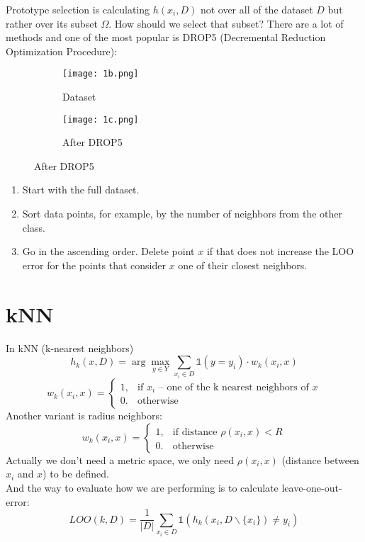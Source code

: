 Prototype selection is calculating $h(x_i, D)$ not over all of the dataset $D$ but rather over its subset $\Omega$. How should we select that subset? There are a lot of methods and one of the most popular is DROP5 (Decremental Reduction Optimization Procedure):
\begin{figure}[H]
  \centering
  \begin{subfigure}[c]{0.3\linewidth}
    \texttt{[image: 1b.png]}
    \caption*{Dataset}
  \end{subfigure}
  \hspace{2cm}
  \begin{subfigure}[c]{0.3\linewidth}
    \texttt{[image: 1c.png]}
    \caption*{After DROP5}
  \end{subfigure}
\end{figure}
\begin{enumerate}
	\item Start with the full dataset.
	\item Sort data points, for example, by the number of neighbors from the other class.
	\item Go in the ascending order. Delete point $x$ if that does not increase the LOO error for the points that consider $x$ one of their closest neighbors.
\end{enumerate}

\section{kNN}

In kNN (k-nearest neighbors)
$$h_k(x, D)=\arg\max\limits_{y\in Y}\sum\limits_{x_i\in D}\mathbb{1}(y=y_i)\cdot w_k(x_i,x)$$
$$w_k(x_i,x)=\begin{cases}
	1, & \text{if $x_i$ -- one of the k nearest neighbors of $x$} \\
	0. & \text{otherwise}
\end{cases}
$$
Another variant is radius neighbors:
$$w_k(x_i,x)=\begin{cases}
	1, & \text{if distance $\rho(x_i,x)<R$} \\
	0. & \text{otherwise}
\end{cases}
$$
Actually we don't need a metric space, we only need $\rho(x_i, x)$ (distance between $x_i$ and $x$) to be defined. \\
And the way to evaluate how we are performing is to calculate leave-one-out-error:
$$LOO(k,D)=\frac{1}{|D|}\sum\limits_{x_i\in D}\mathbb{1}(h_k(x_i,D\backslash\{x_i\})\ne y_i)$$

